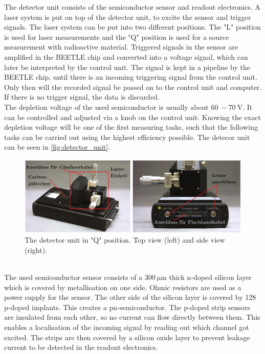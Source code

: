 The detector unit consists of the semiconductor sensor and readout electronics. A laser system is put on top
of the detector unit, to excite the sensor and trigger signals. The laser system can be put into two different
positions. The "L" position is used for laser measurements and the "Q" position is used for a source measurement
with radioactive material. Triggered signals in the sensor are
amplified in the BEETLE chip and converted into a voltage signal, which can later be interpreted by the control unit.
The signal is kept in a pipeline by the BEETLE chip, until there is an incoming triggering signal from the control unit. Only then will the recorded signal
be passed on to the control unit and computer. If there is no trigger signal, the data is discarded.\\
The depletion voltage of the used semiconductor is usually about $\qty{60}{} -  \qty{70}{\volt}$\cite{SiliconStrip}. It can be controlled and adjusted
via a knob on the control unit. Knowing the exact depletion voltage will be one of the first measuring tasks, such that the following
tasks can be carried out using the highest efficiency possible. The detecor unit can be seen in \autoref{fig:detector_unit}.
\begin{figure}
    \centering
    \includegraphics[width = .8\textwidth]{content/pics/detector_unit.png}
    \caption{The detector unit in "Q" position. Top view (left) and side view (right).\cite{SiliconStrip}}
    \label{fig:detector_unit}
\end{figure}\\
The used semiconductor sensor consists of a $\qty{300}{\micro\metre}$ thick n-doped silicon layer which is covered by metallisation
on one side. Ohmic resistors are used as a power supply for the sensor. The other side of the silicon layer is covered
by 128 p-doped implants. This creates a pn-semiconductor. The p-doped strip sensors are insulated from each other, so
no current can flow directly between them. This enables a localisation of the incoming signal by reading out which
channel got excited. The strips are then covered by a silicon oxide layer to prevent leakage current to be detected in the readout electronics.
